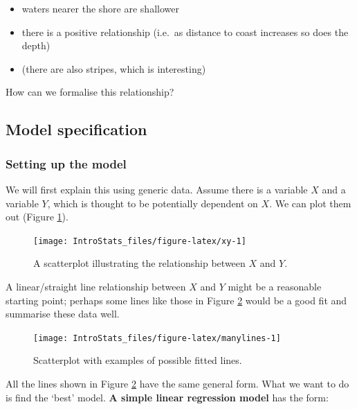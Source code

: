 \documentclass[
  oneside]{krantz}
\providecommand{\tightlist}{%
  \setlength{\itemsep}{0pt}\setlength{\parskip}{0pt}}
\begin{document}
\begin{itemize}
\tightlist
\item
  waters nearer the shore are shallower
\item
  there is a positive relationship (i.e.~as distance to coast increases so does the depth)
\item
  (there are also stripes, which is interesting)
\end{itemize}

How can we formalise this relationship?

\hypertarget{model-specification}{%
\subsection{Model specification}\label{model-specification}}

\hypertarget{setting-up-the-model}{%
\subsubsection{Setting up the model}\label{setting-up-the-model}}

We will first explain this using generic data. Assume there is a variable \(X\) and a variable \(Y\),
which is thought to be potentially dependent on \(X\). We can plot them out (Figure \ref{fig:xy}).

\begin{figure}

{\centering \texttt{[image: IntroStats\_files/figure-latex/xy-1]} 

}

\caption{A scatterplot illustrating the relationship between $X$ and $Y$.}\label{fig:xy}
\end{figure}

\newpage

A linear/straight line relationship between \(X\) and \(Y\) might be a reasonable starting point; perhaps some lines like those in Figure \ref{fig:manylines} would be a good fit and summarise these data well.

\begin{figure}

{\centering \texttt{[image: IntroStats\_files/figure-latex/manylines-1]} 

}

\caption{Scatterplot with examples of possible fitted lines.}\label{fig:manylines}
\end{figure}

All the lines shown in Figure \ref{fig:manylines} have the same general form. What we want to do is find the `best' model. \textbf{A simple linear regression model} has the form:
\end{document}
